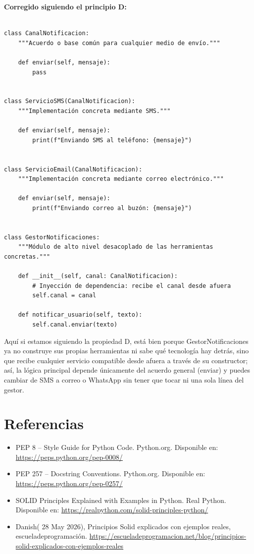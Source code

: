 \documentclass{article}
\begin{document}
        		\textbf{Corregido siguiendo el principio D:}
        		\begin{verbatim}

class CanalNotificacion:
    """Acuerdo o base común para cualquier medio de envío."""

    def enviar(self, mensaje):
        pass


class ServicioSMS(CanalNotificacion):
    """Implementación concreta mediante SMS."""

    def enviar(self, mensaje):
        print(f"Enviando SMS al teléfono: {mensaje}")


class ServicioEmail(CanalNotificacion):
    """Implementación concreta mediante correo electrónico."""

    def enviar(self, mensaje):
        print(f"Enviando correo al buzón: {mensaje}")


class GestorNotificaciones:
    """Módulo de alto nivel desacoplado de las herramientas concretas."""

    def __init__(self, canal: CanalNotificacion):
        # Inyección de dependencia: recibe el canal desde afuera
        self.canal = canal

    def notificar_usuario(self, texto):
        self.canal.enviar(texto)

        		\end{verbatim}
        			Aquí si estamos siguiendo la propiedad D, está bien porque GestorNotificaciones ya no construye sus 
					propias herramientas ni sabe qué tecnología hay detrás, sino que recibe cualquier servicio compatible desde 
					afuera a través de su constructor; así, la lógica principal depende únicamente del acuerdo general (enviar) y 
					puedes cambiar de SMS a correo o WhatsApp sin tener que tocar ni una sola línea del gestor.

    \section{Referencias}
        \begin{itemize}
            \item PEP 8 -- Style Guide for Python Code. Python.org. Disponible en: \url{https://peps.python.org/pep-0008/}
            \item PEP 257 -- Docstring Conventions. Python.org. Disponible en: \url{https://peps.python.org/pep-0257/}
            \item SOLID Principles Explained with Examples in Python. Real Python. Disponible en: \url{https://realpython.com/solid-principles-python/}
            \item Danish( 28 May 2026), Principios Solid explicados con ejemplos reales, escueladeprogramación. \url{https://escueladeprogramacion.net/blog/principios-solid-explicados-con-ejemplos-reales}
        \end{itemize}
\end{document}
